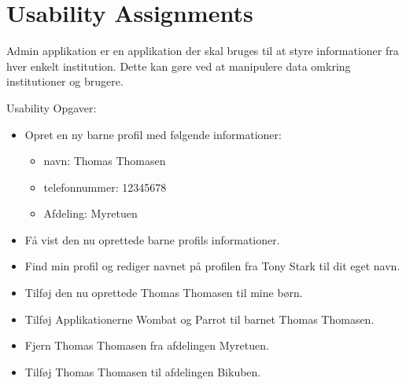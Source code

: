\chapter{Usability Assignments}
\label{sec:usabilityAss}
Admin applikation er en applikation der skal bruges til at styre informationer fra hver enkelt institution. Dette kan g\o{}re ved at manipulere data omkring institutioner og brugere.

Usability Opgaver:
\begin{itemize}
\item Opret en ny barne profil med f\o{}lgende informationer:
\begin{itemize}
		\item navn: 			Thomas Thomasen
		\item telefonnummer: 	12345678
		\item Afdeling:			Myretuen
		\end{itemize}
\item F\aa{} vist den nu oprettede barne profils informationer.
\item Find min profil og rediger navnet p\aa{} profilen fra Tony Stark til dit eget navn.
\item Tilf\o{}j den nu oprettede Thomas Thomasen til mine b\o{}rn.
\item Tilf\o{}j Applikationerne Wombat og Parrot til barnet Thomas Thomasen.
\item Fjern Thomas Thomasen fra afdelingen Myretuen.
\item Tilf\o{}j Thomas Thomasen til afdelingen Bikuben.
\end{itemize}